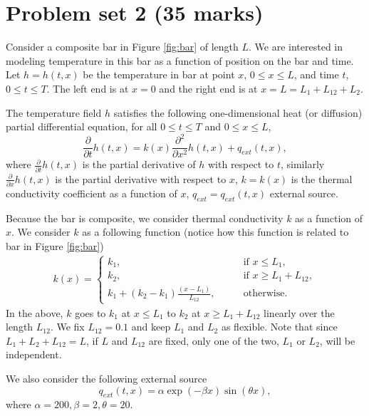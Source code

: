 \documentclass[11pt,a4paper]{article}
\newcommand{\p}{\partial }
\begin{document}
\section{Problem set 2 (35 marks)}
Consider a composite bar in Figure \ref{fig:bar} of length $L$. We are interested in modeling temperature in this bar as a function of position on the bar and time. Let $h = h(t, x)$ be the temperature in bar at point $x$, $0\leq x \leq L$, and time $t$, $0 \leq t \leq T$. The left end is at $x=0$ and the right end is at $x=L = L_1 + L_{12}+L_2$.

The temperature field $h$ satisfies the following one-dimensional heat (or diffusion) partial differential equation, for all $0 \leq t \leq T$ and $0\leq x \leq L$,
\begin{equation}\label{eq:pde}
\frac{\p}{\p t} h(t, x) = k(x) \frac{\p^2 }{\p x^2} h(t, x) + q_{ext}(t, x),
\end{equation}
where $\frac{\p}{\p t} h(t, x)$ is the partial derivative of $h$ with respect to $t$, similarly $\frac{\p}{\p x} h(t, x)$ is the partial derivative with respect to $x$, $k = k(x)$ is the thermal conductivity coefficient as a function of $x$, $q_{ext} = q_{ext}(t, x)$ external source. 

Because the bar is composite, we consider thermal conductivity $k$ as a function of $x$. We consider $k$ as a following function (notice how this function is related to bar in Figure \ref{fig:bar})
\begin{align}\label{eq:cond}
k(x) = \begin{cases}
k_1, & \qquad \text{if } x \leq L_1, \\
k_2, & \qquad \text{if } x \geq L_1+L_{12}, \\
k_1 + (k_2 - k_1)\frac{(x - L_1)}{L_{12} }, &\qquad \text{otherwise}.
\end{cases}
\end{align}
In the above, $k$ goes to $k_1$ at $x \leq L_1$ to $k_2$ at $x \geq L_1+L_{12}$ linearly over the length $L_{12}$. We fix $L_{12} = 0.1$ and keep $L_1$ and $L_2$ as flexible. Note that since $L_1 + L_2 + L_{12} = L$, if $L$ and $L_{12}$ are fixed, only one of the two, $L_1$ or $L_2$, will be independent. 

We also consider the following external source
\begin{equation}\label{eq:qext}
q_{ext}(t, x) = \alpha \exp(-\beta x) \sin(\theta x),
\end{equation}
where $\alpha = 200, \beta = 2, \theta = 20$.
\end{document}
